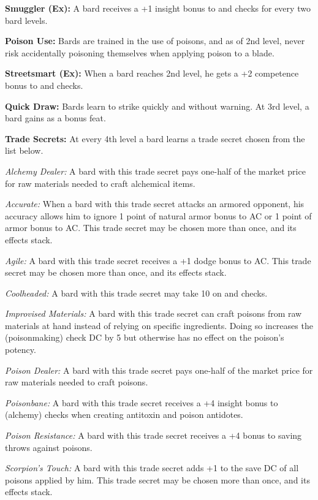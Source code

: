 \textbf{Smuggler (Ex):} A bard receives a +1 insight bonus to  and  checks for every two bard levels.

\textbf{Poison Use:} Bards are trained in the use of poisons, and as of 2nd level, never risk accidentally poisoning themselves when applying poison to a blade.

\textbf{Streetsmart (Ex):} When a bard reaches 2nd level, he gets a +2 competence bonus to  and  checks.

\textbf{Quick Draw:} Bards learn to strike quickly and without warning. At 3rd level, a bard gains  as a bonus feat.

\textbf{Trade Secrets:} At every 4th level a bard learns a trade secret chosen from the list below.

\textit{Alchemy Dealer:} A bard with this trade secret pays one-half of the market price for raw materials needed to craft alchemical items.

\textit{Accurate:} When a bard with this trade secret attacks an armored opponent, his accuracy allows him to ignore 1 point of natural armor bonus to AC or 1 point of armor bonus to AC. This trade secret may be chosen more than once, and its effects stack.

\textit{Agile:} A bard with this trade secret receives a +1 dodge bonus to AC. This trade secret may be chosen more than once, and its effects stack.

\textit{Coolheaded:} A bard with this trade secret may take 10 on  and  checks.

\textit{Improvised Materials:} A bard with this trade secret can craft poisons from raw materials at hand instead of relying on specific ingredients. Doing so increases the  (poisonmaking) check DC by 5 but otherwise has no effect on the poison's potency.

\textit{Poison Dealer:} A bard with this trade secret pays one-half of the market price for raw materials needed to craft poisons.

\textit{Poisonbane:} A bard with this trade secret receives a +4 insight bonus to  (alchemy) checks when creating antitoxin and poison antidotes.

\textit{Poison Resistance:} A bard with this trade secret receives a +4 bonus to saving throws against poisons.

\textit{Scorpion's Touch:} A bard with this trade secret adds +1 to the save DC of all poisons applied by him. This trade secret may be chosen more than once, and its effects stack.

